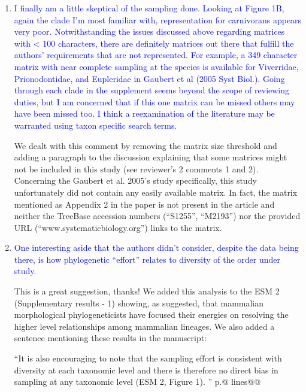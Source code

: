 \documentclass[12pt,letterpaper]{article}
\begin{document}
\begin{enumerate}
\item{\textcolor{blue}{I finally am a little skeptical of the sampling done. Looking at Figure 1B, again the clade I'm most familiar with, representation for carnivorans appears very poor. Notwithstanding the issues discussed above regarding matrices with < 100 characters, there are definitely matrices out there that fulfill the authors' requirements that are not represented. For example, a 349 character matrix with near complete sampling at the species is available for Viverridae, Prionodontidae, and Eupleridae in Gaubert et al (2005 Syst Biol.). Going through each clade in the supplement seems beyond the scope of reviewing duties, but I am concerned that if this one matrix can be missed others may have been missed too. I think a reexamination of the literature may be warranted using taxon specific search terms.}}

We dealt with this comment by removing the matrix size threshold and adding a paragraph to the discussion explaining that some matrices might not be included in this study (see reviewer's 2 comments 1 and 2).
Concerning the Gaubert et al. 2005's study specifically, this study unfortunately did not contain any easily available matrix.
In fact, the matrix mentioned as Appendix 2 in the paper is not present in the article and neither the TreeBase accession numbers (``S1255'', ``M2193'') nor the provided URL (``www.systematicbiology.org'') links to the matrix.

\item{\textcolor{blue}{One interesting aside that the authors didn't consider, despite the data being there, is how phylogenetic ``effort'' relates to diversity of the order under study.}}

This is a great suggestion, thanks!
We added this analysis to the ESM 2 (Supplementary results - 1) showing, as suggested, that mammalian morphological phylogeneticists have focused their energies on resolving the higher level relationships among mammalian lineages.
We also added a sentence mentioning these results in the manuscript:

``It is also encouraging to note that the sampling effort is consistent with diversity at each taxonomic level and there is therefore no direct bias in sampling at any taxonomic level (ESM 2, Figure 1).
'' p.@ lines@@

\end{enumerate}
\end{document}
